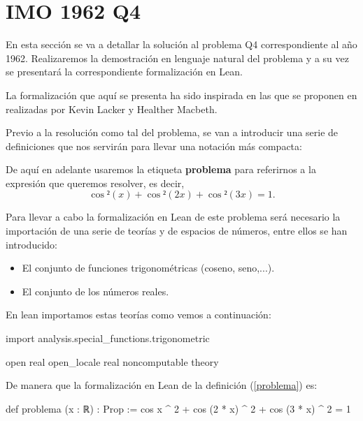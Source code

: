 \section{IMO 1962 Q4}

En esta sección se va a detallar la solución al problema Q4
correspondiente al año 1962. Realizaremos la demostración en lenguaje
natural del problema y a su vez se presentará la correspondiente
formalización en Lean.

La formalización que aquí se presenta ha sido inspirada en
las que se proponen en \cite{KLHM} realizadas por Kevin Lacker y
Healther Macbeth.

\noindent
{}



Previo a la resolución como tal del problema, se van a introducir
una serie de definiciones que nos servirán para llevar una notación
más compacta:

\begin{definicion}\label{problema}
  De aquí en adelante usaremos la etiqueta \textbf{problema}
  para referirnos a la expresión que queremos resolver,
  es decir,
  \begin{equation}\label{expresionprob}
    \cos²(x)+\cos²(2x)+\cos²(3x)=1.
  \end{equation}
\end{definicion}

Para llevar a cabo la formalización en Lean de este problema
será necesario la importación de una serie de teorías y de
espacios de números, entre ellos se han introducido:
\begin{itemize}
  \item El conjunto de funciones trigonométricas (coseno, seno,...).
  \item El conjunto de los números reales.
\end{itemize}

En lean importamos estas teorías como vemos a continuación:
\begin{leancode}
import analysis.special_functions.trigonometric

open real
open_locale real
noncomputable theory
\end{leancode}


De manera que la formalización en Lean de la definición
(\ref{problema}) es:
\begin{leancode}
def problema (x : ℝ) : Prop :=
cos x ^ 2 + cos (2 * x) ^ 2 + cos (3 * x) ^ 2 = 1
\end{leancode}

